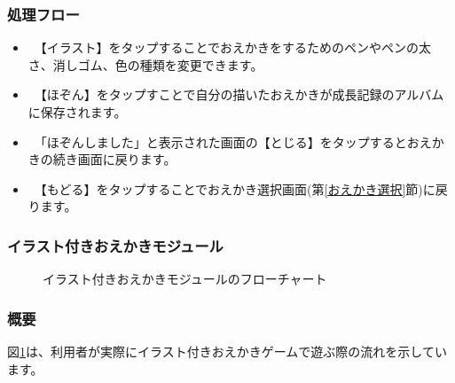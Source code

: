 \documentclass[a4j]{jarticle}
\begin{document}
\subsubsection*{処理フロー}
\begin{itemize}
\item　【イラスト】をタップすることでおえかきをするためのペンやペンの太さ、消しゴム、色の種類を変更できます。
\item　【ほぞん】をタップすことで自分の描いたおえかきが成長記録のアルバムに保存されます。
\item　「ほぞんしました」と表示された画面の【とじる】をタップするとおえかきの続き画面に戻ります。　
\item　【もどる】をタップすることでおえかき選択画面(第\ref{おえかき選択}節)に戻ります。
\end{itemize}

\newpage
\subsubsection{イラスト付きおえかきモジュール\label{イラスト}}
\begin{figure}[H]
    \begin{center}
    \caption {イラスト付きおえかきモジュールのフローチャート}
    \label{illustration}
    \end{center}
\end{figure}

\subsubsection*{概要}
図\ref{illustration}は、利用者が実際にイラスト付きおえかきゲームで遊ぶ際の流れを示しています。
\end{document}
